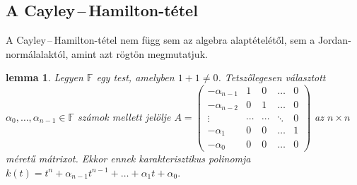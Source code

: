 \documentclass[a4paper, showtrims]{memoir}
\theoremstyle{plain}
\newtheorem{lemma}[proposition]{lemma}
\theoremstyle{remark}
\theoremstyle{definition}
\begin{document}
\subsection{A Cayley\,--\,Hamilton-tétel}
A Cayley\,--\,Hamilton-tétel nem függ sem az algebra alaptételétől, sem a Jordan-normálalaktól, amint azt rögtön megmutatjuk.
\begin{lemma}
	Legyen $\mathbb{F}$ egy test, amelyben $1+1\neq 0$.
	Tetszőlegesen választott $\alpha_0,\ldots,\alpha_{n-1}\in\mathbb{F}$ számok mellett
	jelölje
	\(
	A=
	\begin{pmatrix}
		-\alpha_{n-1} & 1      & 0      & \dots  & 0 \\
		-\alpha_{n-2} & 0      & 1      & \dots  & 0 \\
		\vdots        & \cdots & \cdots & \ddots & 0 \\
		-\alpha_1     & 0      & 0      & \dots  & 1 \\
		-\alpha_0     & 0      & 0      & \dots  & 0
	\end{pmatrix}
	\)
	az $n\times n$ méretű mátrixot.
	Ekkor ennek karakterisztikus polinomja
	\begin{math}
		k\left( t \right)
		=
		t^n+\alpha_{n-1}t^{n-1}+\dots+\alpha_1t+\alpha_0.
	\end{math}
\end{lemma}
\end{document}

